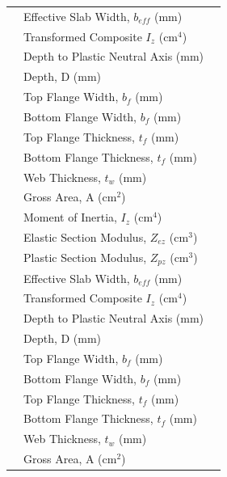 \documentclass[12pt,a4paper]{report}
\numberwithin{table}{chapter}
\numberwithin{figure}{chapter}
\begin{document}
\begin{longtable}{|C{2.5cm}|L{8.0cm}|>{\centering\arraybackslash}p{5.0cm}|}
 & \textnormal{Effective Slab Width, $b_{eff}$ (mm)} &  \\[6pt]
 & \textnormal{Transformed Composite $I_z$ (cm$^4$)} &  \\[6pt]
 & \textnormal{Depth to Plastic Neutral Axis (mm)} &  \\[6pt]
\hline
{} & \textnormal{Depth, D (mm)} &  \\[6pt]
 & \textnormal{Top Flange Width, $b_f$ (mm)} &  \\[6pt]
 & \textnormal{Bottom Flange Width, $b_f$ (mm)} &  \\[6pt]
 & \textnormal{Top Flange Thickness, $t_f$ (mm)} &  \\[6pt]
 & \textnormal{Bottom Flange Thickness, $t_f$ (mm)} &  \\[6pt]
 & \textnormal{Web Thickness, $t_w$ (mm)} &  \\[6pt]
 & \textnormal{Gross Area, A (cm$^2$)} &  \\[6pt]
 & \textnormal{Moment of Inertia, $I_z$ (cm$^4$)} &  \\[6pt]
 & \textnormal{Elastic Section Modulus, $Z_{ez}$ (cm$^3$)} &  \\[6pt]
 & \textnormal{Plastic Section Modulus, $Z_{pz}$ (cm$^3$)} &  \\[6pt]
 & \textnormal{Effective Slab Width, $b_{eff}$ (mm)} &  \\[6pt]
 & \textnormal{Transformed Composite $I_z$ (cm$^4$)} &  \\[6pt]
 & \textnormal{Depth to Plastic Neutral Axis (mm)} &  \\[6pt]
\hline
{} & \textnormal{Depth, D (mm)} &  \\[6pt]
 & \textnormal{Top Flange Width, $b_f$ (mm)} &  \\[6pt]
 & \textnormal{Bottom Flange Width, $b_f$ (mm)} &  \\[6pt]
 & \textnormal{Top Flange Thickness, $t_f$ (mm)} &  \\[6pt]
 & \textnormal{Bottom Flange Thickness, $t_f$ (mm)} &  \\[6pt]
 & \textnormal{Web Thickness, $t_w$ (mm)} &  \\[6pt]
 & \textnormal{Gross Area, A (cm$^2$)} &  \\[6pt]

\end{longtable}
\end{document}
